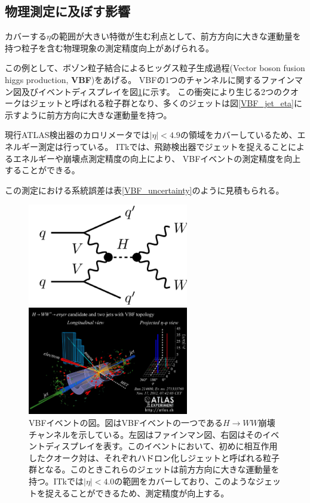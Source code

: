 \clearpage
\subsection{物理測定に及ぼす影響}
カバーする$\eta$の範囲が大きい特徴が生む利点として、前方方向に大きな運動量を持つ粒子を含む物理現象の測定精度向上があげられる。

この例として、ボゾン粒子結合によるヒッグス粒子生成過程(Vector boson fusion higgs production, \textbf{VBF})をあげる。
VBFの1つのチャンネルに関するファインマン図及びイベントディスプレイを図\ref{VBF_image}に示す。
この衝突により生じる2つのクオークはジェットと呼ばれる粒子群となり、多くのジェットは図\ref{VBF_jet_eta}に示すように前方方向に大きな運動量を持つ。

現行ATLAS検出器のカロリメータでは$|\eta|<4.9$の領域をカバーしているため、エネルギー測定は行っている。
ITkでは、飛跡検出器でジェットを捉えることによるエネルギーや崩壊点測定精度の向上により、
VBFイベントの測定精度を向上することができる。

この測定における系統誤差は表\ref{VBF_uncertainty}のように見積もられる\cite{1-3}。

\begin{figure}[bpt]
  \begin{minipage}{0.5\hsize}
    \begin{center}
    \includegraphics[width=70mm]{./VBF_fainman.png}
    \end{center}
  \end{minipage}
  \begin{minipage}{0.5\hsize}
    \begin{center}
    \includegraphics[width=70mm]{./VBF_event_display.png}
    \end{center}
  \end{minipage}
  \caption[VBFイベントの図]{VBFイベントの図\cite{1-8}。図はVBFイベントの一つである$H\rightarrow WW$崩壊チャンネルを示している。左図はファインマン図、右図はそのイベントディスプレイを表す。このイベントにおいて、初めに相互作用したクオーク対は、それぞれハドロン化しジェットと呼ばれる粒子群となる。このときこれらのジェットは前方方向に大きな運動量を持つ。ITkでは$|\eta|<4.0$の範囲をカバーしており、このようなジェットを捉えることができるため、測定精度が向上する。}
  \label{VBF_image}
\end{figure}

